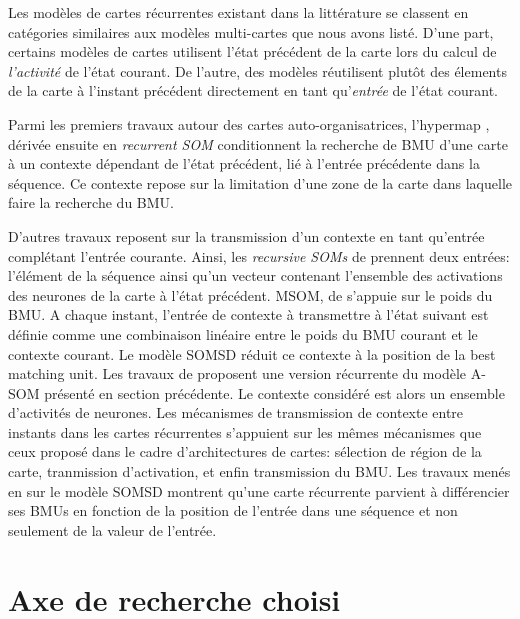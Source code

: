 \documentclass[../main]{subfiles}
\begin{document}
Les modèles de cartes récurrentes existant dans la littérature se classent en catégories similaires aux modèles multi-cartes que nous avons listé.
D'une part, certains modèles de cartes utilisent l'état précédent de la carte lors du calcul de \emph{l'activité} de l'état courant. De l'autre, des modèles réutilisent plutôt des élements de la carte à l'instant précédent directement en tant qu'\emph{entrée} de l'état courant.


Parmi les premiers travaux autour des cartes auto-organisatrices, l'hypermap \cite{Kohonen1991THEHA}, dérivée ensuite en \emph{recurrent SOM} \cite{varsta_temporal_2001} conditionnent la recherche de BMU d'une carte à un contexte dépendant de l'état précédent, lié à l'entrée précédente dans la séquence. Ce contexte repose sur la limitation d'une zone de la carte dans laquelle faire la recherche du BMU. 

D'autres travaux reposent sur la transmission d'un contexte en tant qu'entrée complétant l'entrée courante. 
Ainsi, les \emph{recursive SOMs} de \cite{Voegtlin2002RecursiveSM} prennent deux entrées: l'élément de la séquence ainsi qu'un vecteur contenant l'ensemble des activations des neurones de la carte à l'état précédent.
MSOM, de \cite{Strickert2005MergeSF} s'appuie sur le poids du BMU. A chaque instant, l'entrée de contexte à transmettre à l'état suivant est définie comme une combinaison linéaire entre le poids du BMU courant et le contexte courant.
Le modèle SOMSD \cite{hagenbuchner_self-organizing_2003, hammer_recursive_2004,hammer_self-organizing_2005, fix20} réduit ce contexte à la position de la best matching unit.
Les travaux de \cite{Buonamente2013SimulatingAW} proposent une version récurrente du modèle A-SOM présenté en section précédente. Le contexte considéré est alors un ensemble d'activités de neurones.
Les mécanismes de transmission de contexte entre instants dans les cartes récurrentes s'appuient sur les mêmes mécanismes que ceux proposé dans le cadre d'architectures de cartes: sélection de région de la carte, tranmission d'activation, et enfin transmission du BMU.
Les travaux menés en \cite{fix20} sur le modèle SOMSD montrent qu'une carte récurrente parvient à différencier ses BMUs en fonction de la position de l'entrée dans une séquence et non seulement de la valeur de l'entrée.

\section{Axe de recherche choisi}
\end{document}
